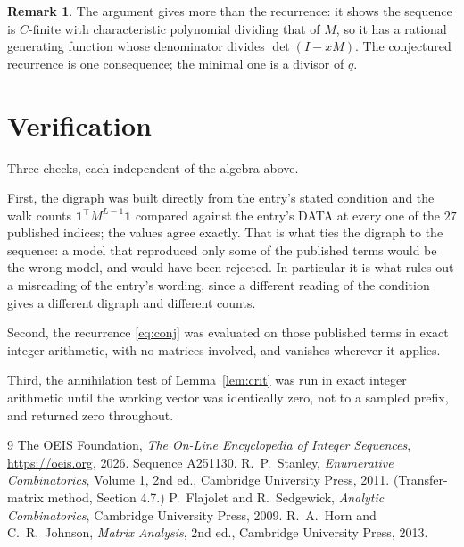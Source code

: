 \documentclass[11pt,a4paper]{article}
\theoremstyle{plain}
\theoremstyle{definition}
\newtheorem{remark}[theorem]{Remark}
\begin{document}
\begin{remark}
The argument gives more than the recurrence: it shows the sequence is $C$-finite with
characteristic polynomial dividing that of $M$, so it has a rational generating function
whose denominator divides $\det(I-xM)$. The conjectured recurrence is one consequence; the
minimal one is a divisor of $q$.
\end{remark}

\section{Verification}

Three checks, each independent of the algebra above.

First, the digraph was built directly from the entry's stated condition and the walk counts
$\mathbf{1}^{\!\top}M^{L-1}\mathbf{1}$ compared against the entry's DATA at
every one of the $27$ published indices; the values agree exactly. That is what ties
the digraph to the sequence: a model that reproduced only some of the published terms would
be the wrong model, and would have been rejected. In particular it is what rules out a
misreading of the entry's wording, since a different reading of the condition gives a
different digraph and different counts.

Second, the recurrence \eqref{eq:conj} was evaluated on those published terms in exact
integer arithmetic, with no matrices involved, and vanishes wherever it applies.

Third, the annihilation test of Lemma~\ref{lem:crit} was run in exact integer arithmetic
until the working vector was identically zero, not to a sampled prefix, and returned zero
throughout.

\begin{thebibliography}{9}
 The OEIS Foundation, \emph{The On-Line Encyclopedia of Integer
Sequences}, \url{https://oeis.org}, 2026. Sequence A251130.
 R.~P.~Stanley, \emph{Enumerative Combinatorics}, Volume 1, 2nd ed.,
Cambridge University Press, 2011. (Transfer-matrix method, Section 4.7.)
 P.~Flajolet and R.~Sedgewick, \emph{Analytic Combinatorics}, Cambridge
University Press, 2009.
 R.~A.~Horn and C.~R.~Johnson, \emph{Matrix Analysis}, 2nd ed., Cambridge
University Press, 2013.
\end{thebibliography}
\end{document}
